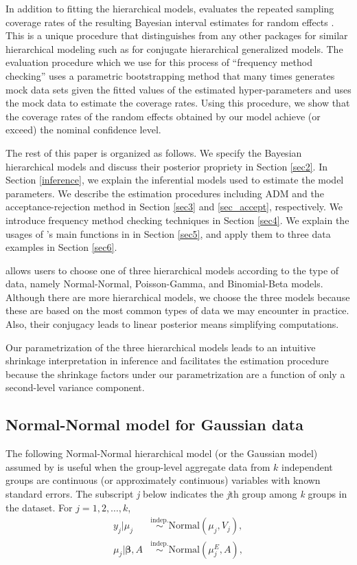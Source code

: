 \documentclass[article]{jss}
\begin{document}
In addition to fitting the hierarchical models,  evaluates the repeated sampling coverage rates of the resulting Bayesian interval estimates for random effects \citep{morris1997, daniels1999prior, tang2002fitting, tang2011, morris2012}. This is a unique procedure that distinguishes   from any other  packages for similar hierarchical modeling such as  \citep{hglm2010, ronnegaard2011hglm} for conjugate hierarchical generalized models. The evaluation procedure which we use for this process of ``frequency method checking'' uses a parametric bootstrapping  method that many times generates mock data sets given the fitted values of the estimated hyper-parameters and uses the mock data to estimate the coverage rates.  Using this procedure, we show that the coverage rates of the random effects obtained by our model achieve (or exceed) the nominal confidence level.

The rest of this paper is organized as follows. We specify the Bayesian hierarchical models and discuss their posterior propriety in Section \ref{sec2}. In Section \ref{inference}, we explain the inferential models used to estimate the model parameters. We describe the estimation procedures including  ADM and the acceptance-rejection method in Section  \ref{sec3} and \ref{sec_accept}, respectively. We introduce  frequency method checking techniques in Section \ref{sec4}.  We explain the usages of 's main functions in  in Section \ref{sec5}, and apply them to three data examples in Section \ref{sec6}.


 allows users to choose one of three hierarchical models according to the type of data, namely Normal-Normal, Poisson-Gamma, and Binomial-Beta models. Although there are more hierarchical models, we choose the three models because these are based on the most common types of  data we may encounter in practice. Also, their conjugacy leads to linear posterior means simplifying computations.

Our parametrization of the three hierarchical models leads to an intuitive shrinkage interpretation in inference and  facilitates the estimation procedure because the shrinkage factors under our parametrization are a function of only a second-level variance component.
 
\subsection[Normal-Normal]{Normal-Normal model for Gaussian data}
The following Normal-Normal hierarchical model (or the Gaussian model) assumed by  is useful when the group-level aggregate data from $k$ independent  groups are continuous (or approximately continuous) variables with known standard errors. The subscript \emph{j} below indicates the \emph{j}th group among \emph{k} groups in the dataset. For $j=1, 2, \ldots, k$, 
\begin{align}
y_{j}\vert \mu_{j} & \stackrel{\textrm{indep.}}{\sim} \textrm{Normal}(\mu_{j}, V_{j}),\label{normalobs}\\
\mu_{j}\vert \boldsymbol{\beta}, A & \stackrel{\textrm{indep.}}{\sim} \textrm{Normal}(\mu^E_{j}, A),\label{normalprior}
\end{align}
\end{document}
